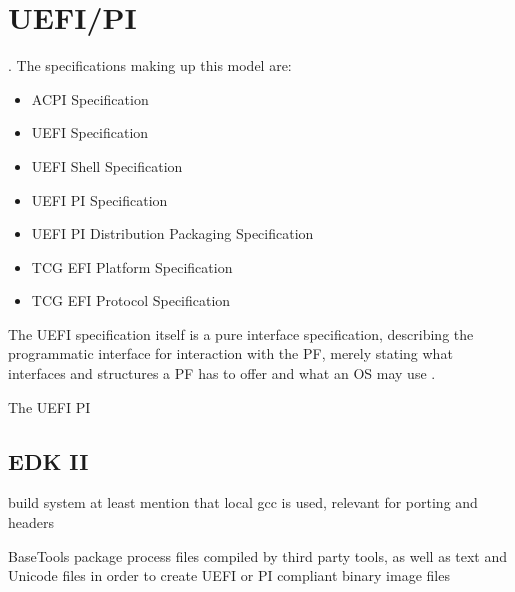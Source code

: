 
\chapter{\acs{UEFI}/\acs{PI}}

.
The specifications making up this model are:

\begin{itemize}
    \item \ac{ACPI} Specification
    \item \ac{UEFI} Specification
    \item \ac{UEFI} Shell Specification
    \item \ac{UEFI} \ac{PI} Specification
    \item \ac{UEFI} \ac{PI} Distribution Packaging Specification
    \item \ac{TCG} \ac{EFI} Platform Specification
    \item \ac{TCG} \ac{EFI} Protocol Specification
\end{itemize}

The \ac{UEFI} specification itself is a pure interface specification, describing the programmatic interface for interaction with the \ac{PF}, merely stating what interfaces and structures a \ac{PF} has to offer and what an \ac{OS} may use \cite{beyond-bios}.

The \ac{UEFI} \ac{PI}





\section{\acs{EDK} II}
build system
at least mention that local gcc is used, relevant for porting and headers

BaseTools package process files compiled by third party tools, as well as text and Unicode files in order to create UEFI or PI compliant binary image files
\cite{tianocore-edk2}